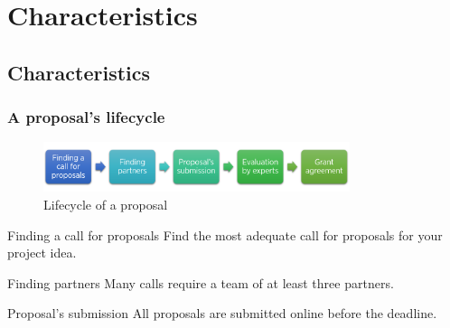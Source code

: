 \documentclass[compress,9pt,xcolor={dvipsnames,table}]{beamer}
\begin{document}
\section{Characteristics}
\subsection{Characteristics}
\begin{frame}\frametitle{A proposal's lifecycle}
\begin{figure}
  \centering
  \includegraphics[width=0.8\textwidth]{images/lifecycle}
  \caption{Lifecycle of a proposal}
  \label{fig:lifecycle}
\end{figure}

\begin{block}{Finding a call for proposals}
Find the most adequate call for proposals for your project idea.
\end{block}


\begin{block}{Finding partners}
Many calls require a team of at least three partners.
\end{block}

\begin{block}{Proposal's submission}
All proposals are submitted online before the deadline.
\end{block}

\end{frame}
\end{document}
